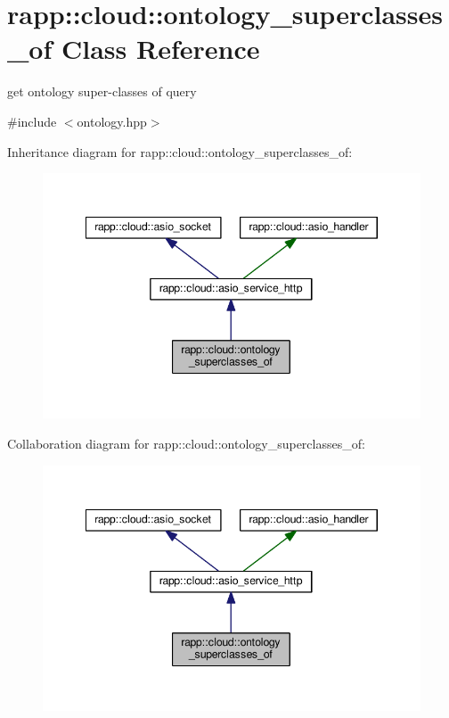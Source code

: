 \hypertarget{classrapp_1_1cloud_1_1ontology__superclasses__of}{\section{rapp\-:\-:cloud\-:\-:ontology\-\_\-superclasses\-\_\-of Class Reference}
\label{classrapp_1_1cloud_1_1ontology__superclasses__of}
}


get ontology super-\/classes of query  




{\ttfamily \#include $<$ontology.\-hpp$>$}



Inheritance diagram for rapp\-:\-:cloud\-:\-:ontology\-\_\-superclasses\-\_\-of\-:
\nopagebreak
\begin{figure}[H]
\begin{center}
\leavevmode
\includegraphics[width=345pt]{classrapp_1_1cloud_1_1ontology__superclasses__of__inherit__graph}
\end{center}
\end{figure}


Collaboration diagram for rapp\-:\-:cloud\-:\-:ontology\-\_\-superclasses\-\_\-of\-:
\nopagebreak
\begin{figure}[H]
\begin{center}
\leavevmode
\includegraphics[width=345pt]{classrapp_1_1cloud_1_1ontology__superclasses__of__coll__graph}
\end{center}
\end{figure}
